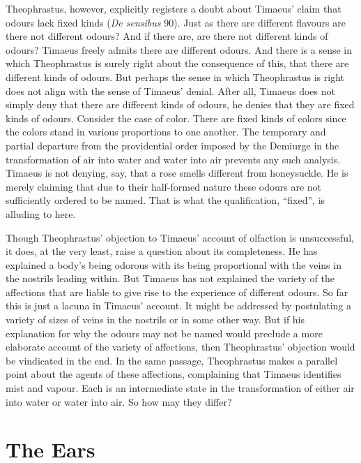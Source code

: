 Theophrastus, however, explicitly registers a doubt about Timaeus' claim that odours lack fixed kinds (\emph{De sensibus} 90). Just as there are different flavours are there not different odours? And if there are, are there not different kinds of odours? Timaeus freely admits there are different odours. And there is a sense in which Theophrastus is surely right about the consequence of this, that there are different kinds of odours. But perhaps the sense in which Theophrastus is right does not align with the sense of Timaeus' denial. After all, Timaeus does not simply deny that there are different kinds of odours, he denies that they are fixed kinds of odours. Consider the case of color. There are fixed kinds of colors since the colors stand in various proportions to one another. The temporary and partial departure from the providential order imposed by the Demiurge in the transformation of air into water and water into air prevents any such analysis. Timaeus is not denying, say, that a rose smells different from honeysuckle. He is merely claiming that due to their half-formed nature these odours are not sufficiently ordered to be named. That is what the qualification, ``fixed'', is alluding to here.

Though Theophrastus' objection to Timaeus' account of olfaction is unsuccessful, it does, at the very least, raise a question  about its completeness. He has explained a body's being odorous with its being proportional with the veins in the nostrils leading within. But Timaeus has not explained the variety of the affections that are liable to give rise to the experience of different odours. So far this is just a lacuna in Timaeus' account. It might be addressed by postulating a variety of sizes of veins in the nostrils or in some other way. But if his explanation for why the odours may not be named would preclude a more elaborate account of the variety of affections, then Theophrastus' objection would be vindicated in the end. In the same passage, Theophrastus makes a parallel point about the agents of these affections, complaining that Timaeus identifies mist and vapour. Each is an intermediate state in the transformation of either air into water or water into air. So how may they differ?


\section{The Ears} %
\label{sec:the_ears}

